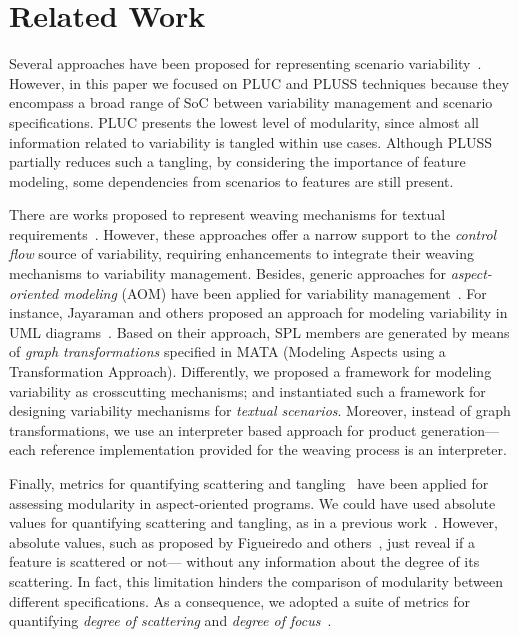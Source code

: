 \section{Related Work}
\label{sec:related}

Several approaches have been proposed for representing
scenario variability~\cite{Jacobson:1997aa,Eriksson:2005aa,Bertolino:2003aa}. However, in this paper
we focused on PLUC and
PLUSS techniques because they encompass a broad range
of SoC between variability management and scenario specifications.
PLUC presents the lowest level of modularity, since
almost all information related to variability is tangled within
use cases. Although PLUSS partially reduces such a tangling,
by considering the importance of feature modeling, some
dependencies from scenarios to features are still present.

There are works proposed to
represent weaving mechanisms for textual
requirements~\cite{Chitchyan:2007aa,Sillito:2004aa}. However, these approaches offer a narrow support to the \emph{control flow} source of variability, requiring enhancements to integrate their weaving mechanisms to variability management. Besides, generic 
approaches for \emph{aspect-oriented modeling} (AOM) have been applied for 
variability management~\cite{Jayaraman:2007aa,Morin:2008aa,Groher:2008aa}. For instance, Jayaraman and others proposed an approach for modeling variability in UML diagrams~\cite{Jayaraman:2007aa}. Based on their approach, SPL members are generated by means of \emph{graph transformations} specified in MATA (Modeling Aspects using a Transformation Approach). Differently, we proposed a framework for modeling variability as crosscutting mechanisms; and instantiated such a framework for designing variability mechanisms for \emph{textual scenarios}. Moreover, instead of graph transformations, we use an interpreter based approach for product generation--- each reference implementation provided for the weaving process is an interpreter.

Finally, metrics for quantifying scattering and tangling~\cite{Eaddy:2007aa,Figueiredo:2008aa} have been applied for assessing modularity in aspect-oriented
programs. We could have used absolute values for quantifying scattering and tangling, as in a previous work~\cite{Bonifacio:2008aa}. However, absolute values, such as proposed by Figueiredo and others~\cite{Figueiredo:2008aa}, just reveal if a feature is scattered or not--- without any information about the degree of its scattering. In fact, this limitation hinders the comparison of modularity between different specifications.
As a consequence, we adopted a suite of metrics for quantifying
\emph{degree of scattering} and \emph{degree of focus}~\cite{Eaddy:2007aa}.




